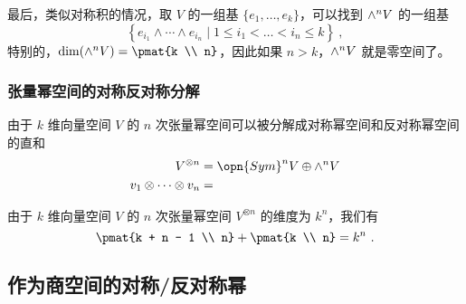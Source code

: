 最后，类似对称积的情况，取 $V$ 的一组基 $\{e_1, \dots, e_k\}$，可以找到 ${\large \wedge}^n V$ 的一组基
\begin{equation}
\left\{ e_{i_1} \wedge \cdots \wedge e_{i_n} \mid 1 \leq i_1 < \dots < i_n \leq k \right\}~,
\end{equation}
特别的，$\dim({\large \wedge}^n V) = \pmat{k \\ n}$，因此如果 $n > k$，${\large \wedge}^n V$ 就是零空间了。

\subsubsection{张量幂空间的对称反对称分解}

由于 $k$ 维向量空间 $V$ 的 $n$ 次张量幂空间可以被分解成对称幂空间和反对称幂空间的直和
\begin{equation}
\begin{aligned}
V^{\otimes n} &= \opn{Sym}^n V \oplus {\large \wedge}^n V \\
v_1 \otimes \cdots \otimes v_n &= 
\end{aligned}
\end{equation}



由于 $k$ 维向量空间 $V$ 的 $n$ 次张量幂空间 $V^{\otimes n}$ 的维度为 $k^n$，我们有
\begin{equation}
\pmat{k + n - 1 \\ n} + \pmat{k \\ n} = k^n~.
\end{equation}


\subsection{作为商空间的对称/反对称幂}